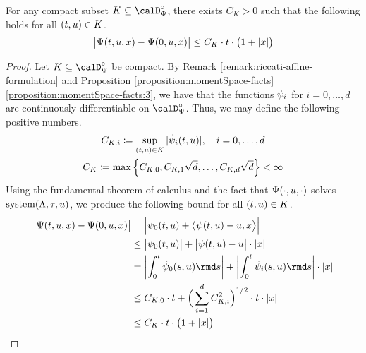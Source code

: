 \begin{proposition}
  \label{proposition:aff-differentiable}
  For any compact subset $K \subseteq \momentSpace^\circ$, there exists $C_K > 0$ such that the following holds for all $(t, u) \in K$.
  \begin{equation*}
    \big| \Psi(t, u, x) - \Psi(0, u, x) \big| \leq C_K \cdot t \cdot \big( 1 + |x| \big)
  \end{equation*}
\end{proposition}
\begin{proof}
  \label{proof:proposition:aff-differentiable}
  Let $K \subseteq \momentSpace^\circ$ be compact.
  By Remark \ref{remark:riccati-affine-formulation} and Proposition \ref{proposition:momentSpace-facts}\ref{proposition:momentSpace-facts:3}, we have that the functions $\psi_i$ for $i = 0, \ldots, d$ are continuously differentiable on $\momentSpace^\circ$.
  Thus, we may define the following positive numbers.
  \begin{gather*}
    C_{K,i} \coloneqq \sup_{(t, u) \in K} |\dot{\psi}_i(t, u)|, \quad i = 0, \ldots, d \\
    C_K \coloneqq \max\Big\{ C_{K,0}, C_{K,1}\sqrt d, \ldots, C_{K,d} \sqrt d \Big\} < \infty
  \end{gather*}
  Using the fundamental theorem of calculus and the fact that $\Psi(\cdot,u,\cdot)$ solves $\operatorname{system}(\Lambda,\tau,u)$, we produce the following bound for all $(t, u) \in K$.
  \begin{align*}
    \big|\aff(t, \momentVar, \stateVar) - \aff(0, \momentVar, \stateVar)\big| 
    &= \Big| \affPart_0(t, \momentVar) + \bprj{\affPart(t, \momentVar) - \momentVar}{\stateVar} \Big| \\
    &\leq \big|\affPart_0(t,\momentVar)\big| + \big|\affPart(t,\momentVar) - \momentVar\big| \cdot |\stateVar| \\
    &= \left| \int_0^t \dot\affPart_0(s,\momentVar) \rmd s \right|
      + \left| \int_0^t \dot\affPart_i(s,\momentVar) \rmd s \right| \cdot |\stateVar| \\
    &\leq C_{K,0} \cdot t + \Big( \sum_{i=1}^d C_{K,i}^2 \Big)^{1/2} \cdot t \cdot |\stateVar| \\
    &\leq C_K  \cdot t \cdot \big( 1 + |\stateVar| \big)
  \end{align*}
\end{proof}
